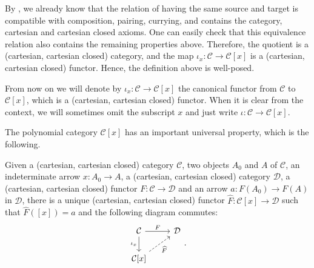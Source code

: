 \begin{remark}
    By , we already know that the relation of having the same source and target is compatible with composition, pairing, currying, and contains the category, cartesian and cartesian closed axioms.
    One can easily check that this equivalence relation also contains the remaining properties above. Therefore, the quotient is a (cartesian, cartesian closed) category, and the map $\iota_x : \mathcal C \to \mathcal C[x]$ is a (cartesian, cartesian closed) functor. Hence, the definition above is well-posed.
\end{remark}

\begin{notation}\label{idx:polynomial-inclusion}
    From now on we will denote by $\iota_x : \mathcal C \to \mathcal C[x]$ the canonical functor from $\mathcal C$ to $\mathcal C[x]$, which is a (cartesian, cartesian closed) functor.
    When it is clear from the context, we will sometimes omit the subscript $x$ and just write $\iota : \mathcal C \to \mathcal C[x]$.
\end{notation}

The polynomial category $\mathcal C[x]$ has an important universal property, which is the following.

\begin{theorem}
    Given a (cartesian, cartesian closed) category $\mathcal C$, two objects $A_0$ and $A$ of $\mathcal C$, an indeterminate arrow $x : A_0 \to A$, a (cartesian, cartesian closed) category $\mathcal D$, a (cartesian, cartesian closed) functor $F : \mathcal C \to \mathcal D$ and an arrow $a : F(A_0) \to F(A)$ in $\mathcal D$,
    there is a unique (cartesian, cartesian closed) functor $\widehat F : \mathcal C[x] \to \mathcal D$ such that $\widehat F([x]) = a$ and the following diagram commutes:
    \[\begin{tikzcd}
        {\mathcal C} & {\mathcal D} \\
        {\mathcal C[x]}
        \arrow["F", from=1-1, to=1-2]
        \arrow["{\iota_x}"', from=1-1, to=2-1]
        \arrow["{\widehat F}"', dashed, from=2-1, to=1-2]
    \end{tikzcd}.\]
\end{theorem}

